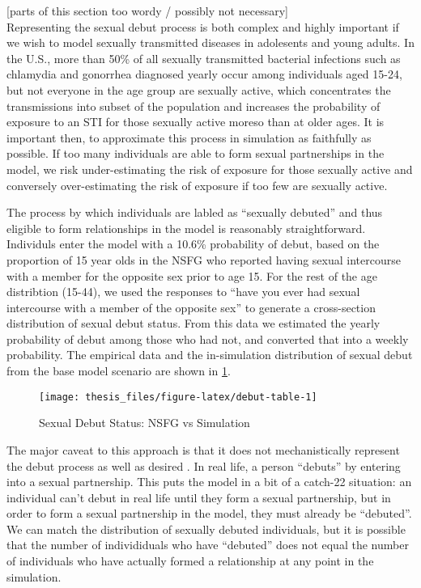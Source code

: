 \documentclass [11pt, proquest] {uwthesis}[2015/03/03]
\begin{document}
{[}parts of this section too wordy / possibly not necessary{]}\\
Representing the sexual debut process is both complex and highly
important if we wish to model sexually transmitted diseases in
adolesents and young adults. In the U.S., more than 50\% of all sexually
transmitted bacterial infections such as chlamydia and gonorrhea
diagnosed yearly occur among individuals aged 15-24, but not everyone in
the age group are sexually active, which concentrates the transmissions
into subset of the population and increases the probability of exposure
to an STI for those sexually active moreso than at older ages. It is
important then, to approximate this process in simulation as faithfully
as possible. If too many individuals are able to form sexual
partnerships in the model, we risk under-estimating the risk of exposure
for those sexually active and conversely over-estimating the risk of
exposure if too few are sexually active.

The process by which individuals are labled as ``sexually debuted'' and
thus eligible to form relationships in the model is reasonably
straightforward. Individuls enter the model with a 10.6\% probability of
debut, based on the proportion of 15 year olds in the NSFG who reported
having sexual intercourse with a member for the opposite sex prior to
age 15. For the rest of the age distribtion (15-44), we used the
responses to ``have you ever had sexual intercourse with a member of the
opposite sex'' to generate a cross-section distribution of sexual debut
status. From this data we estimated the yearly probability of debut
among those who had not, and converted that into a weekly probability.
The empirical data and the in-simulation distribution of sexual debut
from the base model scenario are shown in \ref{fig:debut-table}.
\begin{figure}

{\centering \texttt{[image: thesis\_files/figure-latex/debut-table-1]} 

}

\caption{Sexual Debut Status: NSFG vs Simulation}\label{fig:debut-table}
\end{figure}
The major caveat to this approach is that it does not mechanistically
represent the debut process as well as desired . In real life, a person
``debuts'' by entering into a sexual partnership. This puts the model in
a bit of a catch-22 situation: an individual can't debut in real life
until they form a sexual partnership, but in order to form a sexual
partnership in the model, they must already be ``debuted''. We can match
the distribution of sexually debuted individuals, but it is possible
that the number of individiduals who have ``debuted'' does not equal the
number of individuals who have actually formed a relationship at any
point in the simulation.
\end{document}
